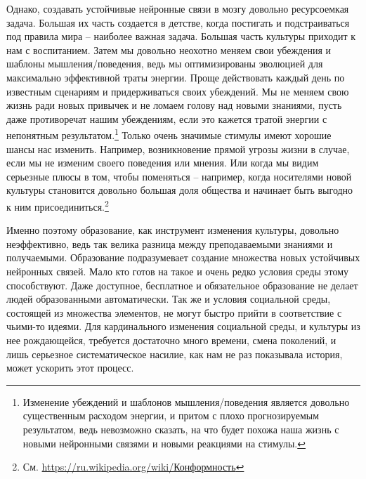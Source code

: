 \documentclass[12pt,a4paper]{report}
\begin{document}
\noindent Однако, создавать устойчивые нейронные связи в мозгу довольно ресурсоемкая задача. Большая их часть создается в детстве, когда постигать и подстраиваться под правила мира -- наиболее важная задача. Большая часть культуры приходит к нам с воспитанием. Затем мы довольно неохотно меняем свои убеждения и шаблоны мышления\hspace{.05em}/\hspace{.05em}поведения, ведь мы оптимизированы эволюцией для максимально эффективной траты энергии. Проще действовать каждый день по известным сценариям и придерживаться своих убеждений. Мы не меняем свою жизнь ради новых привычек и не ломаем голову над новыми знаниями, пусть даже противоречат нашим убеждениям, если это кажется тратой энергии с непонятным результатом.\footnote{Изменение убеждений и шаблонов мышления\hspace{.05em}/\hspace{.05em}поведения является довольно существенным расходом энергии, и притом с плохо прогнозируемым результатом, ведь невозможно сказать, на что будет похожа наша жизнь с новыми нейронными связями и новыми реакциями на стимулы.} Только очень значимые стимулы имеют хорошие шансы нас изменить. Например, возникновение прямой угрозы жизни в случае, если мы не изменим своего поведения или мнения. Или когда мы видим серьезные плюсы в том, чтобы поменяться – например, когда носителями новой культуры становится довольно большая доля общества и начинает быть выгодно к ним присоединиться.\footnote{См. \href{https://ru.wikipedia.org/wiki/\%D0\%9A\%D0\%BE\%D0\%BD\%D1\%84\%D0\%BE\%D1\%80\%D0\%BC\%D0\%BD\%D0\%BE\%D1\%81\%D1\%82\%D1\%8C}{https://ru.wikipedia.org/wiki/Конформность}}

\noindent Именно поэтому образование, как инструмент изменения культуры, довольно неэффективно, ведь так велика разница между преподаваемыми знаниями и получаемыми. Образование подразумевает создание множества новых устойчивых нейронных связей. Мало кто готов на такое и очень редко условия среды этому способствуют. Даже доступное, бесплатное и обязательное образование не делает людей образованными автоматически. Так же и условия социальной среды, состоящей из множества элементов, не могут быстро прийти в соответствие с чьими-то идеями. Для кардинального изменения социальной среды, и культуры из нее рождающейся, требуется достаточно много времени, смена поколений, и лишь серьезное систематическое насилие, как нам не раз показывала история, может ускорить этот процесс.
\end{document}
